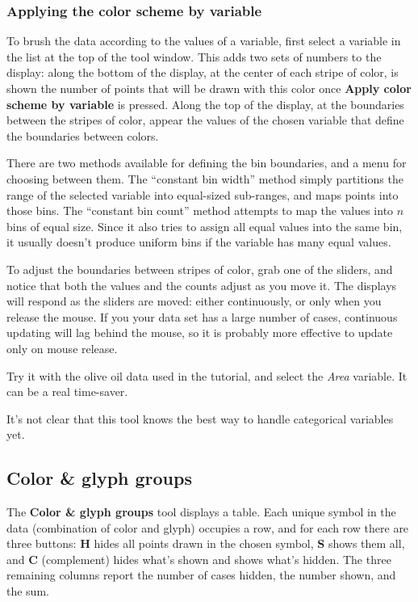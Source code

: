 \documentclass[11pt]{article}
\begin{document}
\subsubsection{Applying the color scheme by variable}

To brush the data according to the values of a variable, first select
a variable in the list at the top of the tool window.  This adds two
sets of numbers to the display:  along the bottom of the display, at
the center of each stripe of color, is shown the number of points that
will be drawn with this color once {\bf Apply color scheme by variable}
is pressed.  Along the top of the display, at the boundaries between the
stripes of color, appear the values of the chosen variable that define
the boundaries between colors. 

There are two methods available for defining the bin boundaries, and
a menu for choosing between them.  The ``constant bin width'' method
simply partitions the range of the selected variable into equal-sized
sub-ranges, and maps points into those bins.  The ``constant bin
count'' method attempts to map the values into $n$ bins of equal
size.  Since it also tries to assign all equal values into the same
bin, it usually doesn't produce uniform bins if the variable has many
equal values.

To adjust the boundaries between stripes of color, grab one of the
sliders, and notice that both the values and the counts adjust as you
move it.  The displays will respond as the sliders are moved:  either
continuously, or only when you release the mouse.  If you your data set
has a large number of cases, continuous updating will lag behind the
mouse, so it is probably more effective to update only on mouse release.

Try it with the olive oil data used in the tutorial, and select the {\it
Area} variable.  It can be a real time-saver.

It's not clear that this tool knows the best way to handle categorical
variables yet.

\subsection{Color \& glyph groups}
\label{slbl:ColorAndGlyphGroups}

The {\bf Color \& glyph groups} tool displays a table.  Each unique
symbol in the data (combination of color and glyph) occupies a row,
and for each row there are three buttons:  {\bf H} hides all points
drawn in the chosen symbol, {\bf S} shows them all, and {\bf C}
(complement) hides what's shown and shows what's hidden.  The three
remaining columns report the number of cases hidden, the number
shown, and the sum.
\end{document}
